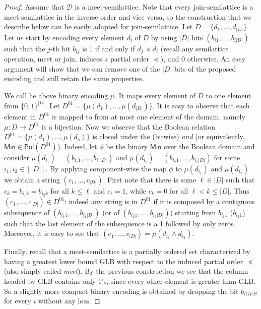\documentclass[11pt]{article}
\newcommand{\Pol}{\textsf{Pol}}
\newcommand{\Min}{\textsf{Min}}
\newcommand{\1}{\textbf{1}}
\begin{document}
\begin{proof}
    Assume that $\mathcal{D}$ is a meet-semilattice. Note that every join-semilattice is a meet-semilattice in the inverse order and vice versa, so the construction that we describe below can be easily adapted for join-semilattice. Let $D=\{d_1,\ldots,d_{|D|}\}$. Let us start by encoding every element $d_i$ of $D$ by using $|D|$ bits $(b_{i1},\ldots,b_{i{|D|}})$ such that the $j$-th bit $b_{ij}$ is 1 if and only if $d_{j}\preceq d_i$ (recall any semilattice operation, meet or join, induces a partial order $\preceq$), and $0$ otherwise. An easy argument will show that we can remove one of the $|D|$ bits of the proposed encoding and still retain the same properties.  
    


    {We call he above binary encoding $\mu$. It maps every element of $D$ to one element from $\{0,1\}^{|D|}$. Let $D^{01}=\{\mu(d_1),\ldots,\mu(d_{|D|})\}$. It is easy to observe that each element in $D^{01}$ is mapped to from at most one element of the domain, namely $\mu:D\rightarrow D^{01}$ is a bijection. Now we observe that the Boolean relation $D^{01} = \{\mu(d_1), \dots, \mu(d_s)\}$ is closed under the (bitwise) \textit{and} (or equivalently, $\Min \in \Pol(D^{01})$). Indeed, let $\phi$ be the binary $\Min$ over the Boolean domain and consider $\mu(d_{i_1}) = (b_{i_1 1}, \dots, b_{i_1 |D|})$ and $\mu(d_{i_2}) = (b_{i_2 1}, \dots, b_{i_2 |D|})$ for some $i_1, i_2 \in [|D|]$. By applying component-wise the map $\phi$ to $\mu(d_{i_1})$ and $\mu(d_{i_2})$ we obtain a string $(c_1, \dots, c_{|D|})$. First note that there is some $\ell \in {|D|}$ such that $c_k = b_{i_1 k} = b_{i_2 k}$ for all $k \leq \ell$ and $c_{\ell} = 1$, while $c_k = 0$ for all $\ell < k \leq |D|$. Thus $(c_1, \dots, c_{|D|}) \in D^{01}$: indeed any string is in $D^{01}$ if it is composed by a contiguous subsequence of $(b_{i_1 1}, \dots, b_{i_1 |D|})$ (or of $(b_{i_2 1}, \dots, b_{i_2 |D|})$) starting from $b_{i_1 1}$ ($b_{i_2 1}$) such that the last element of the subsequence is a 1 followed by only zeros. Moreover, it is easy to see that $(c_1, \dots, c_{|D|}) = \mu(d_{i_1} \wedge d_{i_2})$.
    }

    Finally, recall that a meet-semilattice is a partially ordered set characterized by having a greatest lower bound GLB with respect to the induced partial order $\preceq$ (also simply called \textit{meet}). By the previous construction we see that the column headed by GLB contains only 1's, since every other element is greater than GLB. So a slightly more compact binary encoding is obtained by dropping the bit $b_{iGLB}$ for every $i$ without any loss.
\end{proof}
\end{document}
